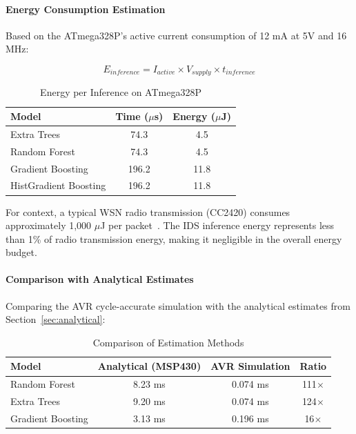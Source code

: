 \paragraph{Energy Consumption Estimation}

Based on the ATmega328P's active current consumption of 12 mA at 5V and 16 MHz:

\begin{equation}
    E_{inference} = I_{active} \times V_{supply} \times t_{inference}
\end{equation}

\begin{table}[htbp]
\centering
\caption{Energy per Inference on ATmega328P}
\label{tab:avr_energy}
\begin{tabular}{lcc}
\hline
\textbf{Model} & \textbf{Time ($\mu$s)} & \textbf{Energy ($\mu$J)} \\
\hline
Extra Trees & 74.3 & 4.5 \\
Random Forest & 74.3 & 4.5 \\
Gradient Boosting & 196.2 & 11.8 \\
HistGradient Boosting & 196.2 & 11.8 \\
\hline
\end{tabular}
\end{table}

For context, a typical WSN radio transmission (CC2420) consumes approximately 1,000 $\mu$J per packet~\cite{polastre2005versatile}. The IDS inference energy represents less than 1\% of radio transmission energy, making it negligible in the overall energy budget.

\paragraph{Comparison with Analytical Estimates}

Comparing the AVR cycle-accurate simulation with the analytical estimates from Section~\ref{sec:analytical}:

\begin{table}[htbp]
\centering
\caption{Comparison of Estimation Methods}
\label{tab:estimation_comparison}
\begin{tabular}{lccc}
\hline
\textbf{Model} & \textbf{Analytical (MSP430)} & \textbf{AVR Simulation} & \textbf{Ratio} \\
\hline
Random Forest & 8.23 ms & 0.074 ms & 111$\times$ \\
Extra Trees & 9.20 ms & 0.074 ms & 124$\times$ \\
Gradient Boosting & 3.13 ms & 0.196 ms & 16$\times$ \\
\hline
\end{tabular}
\end{table}

